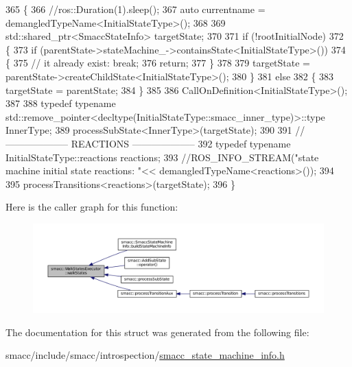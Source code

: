 \begin{DoxyCode}
365 \{
366     \textcolor{comment}{//ros::Duration(1).sleep();}
367     \textcolor{keyword}{auto} currentname = demangledTypeName<InitialStateType>();
368 
369     std::shared\_ptr<SmaccStateInfo> targetState;
370 
371     \textcolor{keywordflow}{if} (!rootInitialNode)
372     \{
373         \textcolor{keywordflow}{if} (parentState->stateMachine\_->containsState<InitialStateType>())
374         \{
375             \textcolor{comment}{// it already exist: break;}
376             \textcolor{keywordflow}{return};
377         \}
378 
379         targetState = parentState->createChildState<InitialStateType>();
380     \}
381     \textcolor{keywordflow}{else}
382     \{
383         targetState = parentState;
384     \}
385 
386     CallOnDefinition<InitialStateType>();
387 
388     \textcolor{keyword}{typedef} \textcolor{keyword}{typename} std::remove\_pointer<decltype(InitialStateType::smacc\_inner\_type)>::type InnerType;
389     processSubState<InnerType>(targetState);
390 
391     \textcolor{comment}{// -------------------- REACTIONS --------------------}
392     \textcolor{keyword}{typedef} \textcolor{keyword}{typename} InitialStateType::reactions reactions;
393     \textcolor{comment}{//ROS\_INFO\_STREAM("state machine initial state reactions: "<< demangledTypeName<reactions>());}
394 
395     processTransitions<reactions>(targetState);
396 \}
\end{DoxyCode}


Here is the caller graph for this function\+:
\nopagebreak
\begin{figure}[H]
\begin{center}
\leavevmode
\includegraphics[width=350pt]{structsmacc_1_1WalkStatesExecutor_a11a2b02eafb62ec298bcf5ffbb32848b_icgraph}
\end{center}
\end{figure}




The documentation for this struct was generated from the following file\+:\begin{DoxyCompactItemize}
\item 
smacc/include/smacc/introspection/\hyperlink{smacc__state__machine__info_8h}{smacc\+\_\+state\+\_\+machine\+\_\+info.\+h}\end{DoxyCompactItemize}
